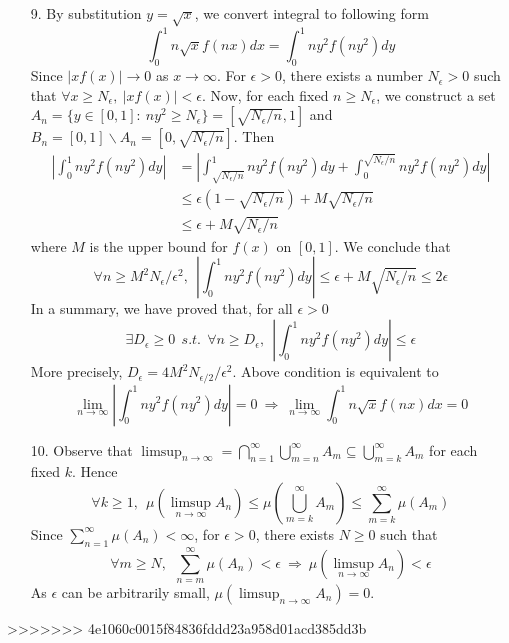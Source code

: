 \begin{itemize}
	\item[9.] By substitution $y= \sqrt{x}$, we convert integral to following form
	$$
	\int_{0}^1 n\sqrt{x}f(nx)dx = \int_{0}^1 ny^2f(ny^2)dy
	$$ 
	Since $\lvert xf(x)\rvert \rightarrow 0$ as $x\rightarrow \infty$. For $\epsilon > 0$, there exists a number $N_\epsilon >0$ such that $\forall x\ge N_\epsilon,~\lvert xf(x)\rvert<\epsilon$. Now, for each fixed $n \ge N_\epsilon$, we construct a set $A_n = \{y\in [0,1]:~ny^2\ge N_\epsilon \} = \left[\sqrt{N_\epsilon/n}, 1\right]$ and $B_n = [0,1]\backslash A_n = \left[0, \sqrt{N_\epsilon/n}\right]$. Then
	$$
	\begin{aligned}
		\left\lvert\int_{0}^1 ny^2f(ny^2)dy\right\rvert &= \left\lvert\int_{\sqrt{N_\epsilon/n}}^1 ny^2f(ny^2)dy+ \int_{0}^{\sqrt{N_\epsilon/n}} ny^2f(ny^2)dy\right\rvert \\&\le \epsilon \left(1-\sqrt{N_\epsilon/n}\right) + M\sqrt{N_\epsilon/n} \\
		&\le \epsilon + M\sqrt{N_\epsilon/n}
	\end{aligned}
	$$
	where $M$ is the upper bound for $f(x)$ on $[0,1]$. We conclude that 
	$$
	\forall n\ge M^2N_\epsilon/\epsilon^2, ~~ \left\lvert\int_{0}^1 ny^2f(ny^2)dy\right\rvert \le  \epsilon +  M\sqrt{N_\epsilon/n}\le 2\epsilon
	$$
	In a summary, we have proved that, for all $\epsilon > 0$
	$$
	\exists D_\epsilon \ge 0 ~~s.t.~~\forall n\ge D_\epsilon,~~\left\lvert\int_{0}^1 ny^2f(ny^2)dy\right\rvert \le \epsilon
	$$
	More precisely, $D_\epsilon= 4M^2N_{\epsilon/2}/\epsilon^2$. 
	Above condition is equivalent to
	 $$\lim_{n\rightarrow\infty} \left\lvert\int_{0}^1 ny^2f(ny^2)dy\right\rvert =0 ~\Rightarrow~ \lim_{n\rightarrow\infty} \int_{0}^1 n\sqrt{x}f(nx)dx=0$$
	
	\item[10.] Observe that $\limsup_{n\rightarrow \infty} = \bigcap_{n=1}^\infty \bigcup_{m=n}^\infty A_m \subseteq \bigcup_{m=k}^\infty A_m$ for each fixed $k$.
	Hence
	$$
	\forall k\ge 1,~~\mu\left(\limsup_{n\rightarrow \infty}A_n\right)\le \mu\left(\bigcup_{m=k}^\infty A_m\right) \le \sum_{m=k}^\infty \mu\left(A_m\right)
	$$
	Since $\sum_{n=1}^\infty \mu\left(A_n\right) < \infty$, for $\epsilon >0$, there exists $N\ge 0$ such that
	$$
	\forall m\ge N,~~\sum_{n=m}^\infty \mu\left(A_n\right) < \epsilon ~\Rightarrow~ \mu\left(\limsup_{n\rightarrow \infty}A_n\right)<\epsilon
	$$
	As $\epsilon$ can be arbitrarily small, $\mu\left(\limsup_{n\rightarrow \infty}A_n\right) = 0$.
\end{itemize}
>>>>>>> 4e1060c0015f84836fddd23a958d01acd385dd3b
